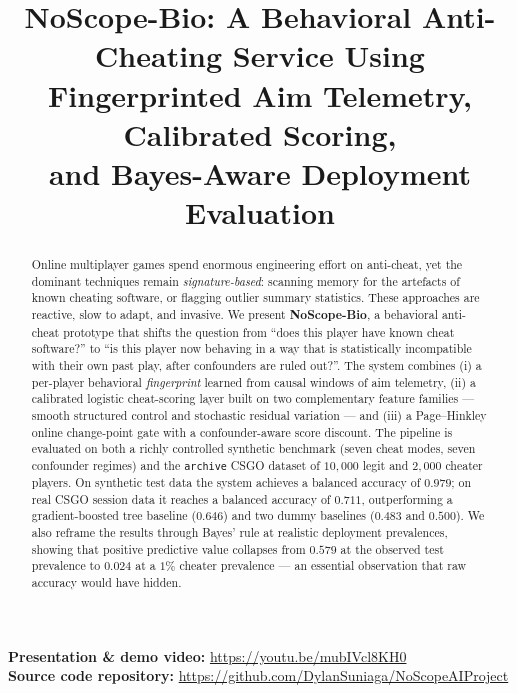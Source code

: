 \documentclass[conference,10pt]{IEEEtran}
\newcommand{\presentationvideourl}{\url{https://youtu.be/mubIVcl8KH0}}
\newcommand{\githubrepourl}{\url{https://github.com/DylanSuniaga/NoScopeAIProject}}
\begin{document}
\title{NoScope-Bio: A Behavioral Anti-Cheating Service Using\\
  Fingerprinted Aim Telemetry, Calibrated Scoring,\\
  and Bayes-Aware Deployment Evaluation}

\author{
}

\maketitle

\noindent\textbf{Presentation \& demo video:}
\presentationvideourl\\[2pt]
\noindent\textbf{Source code repository:} \githubrepourl

\begin{abstract}
Online multiplayer games spend enormous engineering effort on anti-cheat,
yet the dominant techniques remain \emph{signature-based}: scanning memory
for the artefacts of known cheating software, or flagging outlier summary
statistics. These approaches are reactive, slow to adapt, and invasive.
We present \textbf{NoScope-Bio}, a behavioral anti-cheat prototype that
shifts the question from ``does this player have known cheat software?''
to ``is this player now behaving in a way that is statistically
incompatible with their own past play, after confounders are ruled out?''.
The system combines (i) a per-player behavioral \emph{fingerprint}
learned from causal windows of aim telemetry, (ii) a calibrated logistic
cheat-scoring layer built on two complementary feature families --- smooth
structured control and stochastic residual variation --- and (iii) a
Page--Hinkley online change-point gate with a confounder-aware score
discount. The pipeline is evaluated on both a richly controlled synthetic
benchmark (seven cheat modes, seven confounder regimes) and the
\texttt{archive} CSGO dataset of $10{,}000$ legit and $2{,}000$ cheater
players. On synthetic test data the system achieves a balanced accuracy
of $0.979$; on real CSGO session data it reaches a balanced accuracy of
$0.711$, outperforming a gradient-boosted tree baseline ($0.646$) and two
dummy baselines ($0.483$ and $0.500$). We also reframe the results
through Bayes' rule at realistic deployment prevalences, showing that
positive predictive value collapses from $0.579$ at the observed test
prevalence to $0.024$ at a $1\%$ cheater prevalence --- an essential
observation that raw accuracy would have hidden.
\end{abstract}
\end{document}
